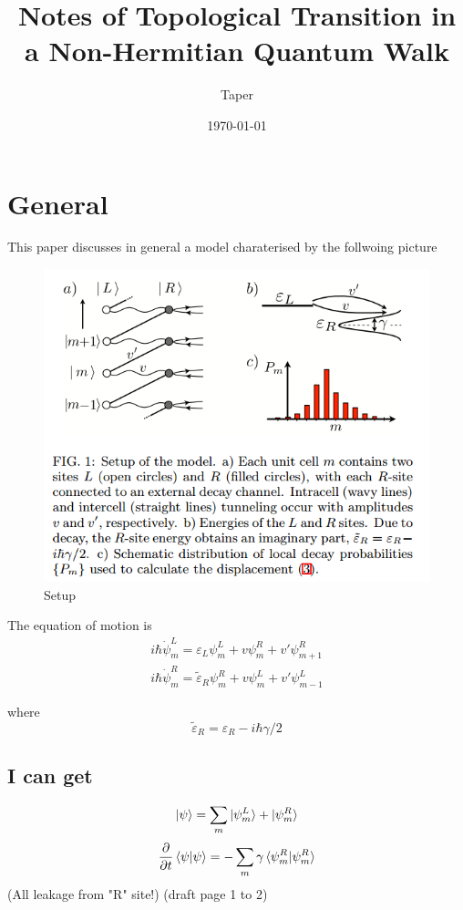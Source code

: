 \documentclass{article}
\title{Notes of Topological Transition in a Non-Hermitian Quantum Walk}
\date{\today}
\author{Taper}
\begin{document}
\maketitle
{}
\tableofcontents
\section{General}
\label{sec:General}

This paper discusses in general a model charaterised by the follwoing
picture
\begin{figure}[H]
    \centering
    \includegraphics[width=0.8\linewidth]{pics/setup.PNG}
    \caption{Setup}
\end{figure}
The equation of motion is
\begin{align}
    i\hbar \dot{\psi}^L_m = \varepsilon_L\psi^L_m + v\psi^R_m
    +v'\psi^R_{m+1} \\
    i\hbar \dot{\psi}^R_m = \tilde{\varepsilon}_R\psi^R_m + v\psi^L_m
    +v'\psi^L_{m-1}
\end{align}

where
\begin{equation}
    \tilde\varepsilon_R = \varepsilon_R - i\hbar \gamma/2
\end{equation}

\subsection{I can get}
\label{sec:I-can-get}

\begin{equation}
    \ket{\psi} = \sum_m \ket{\psi_m^L} + \ket{\psi_m^R}
\end{equation}
\begin{equation}
    \frac{\partial }{\partial t}\braket{\psi|\psi}
    = -\sum_m \gamma \braket{\psi^R_m|\psi^R_m}
\end{equation}
(All leakage from "R" site!)
(draft page 1 to 2)
\end{document}
